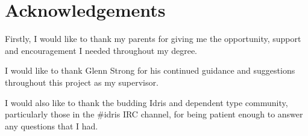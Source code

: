 \chapter*{Acknowledgements}
Firstly, I would like to thank my parents for giving me the opportunity, support
and encouragement I needed throughout my degree.

I would like to thank Glenn Strong for his continued guidance and suggestions
throughout this project as my supervisor.

I would also like to thank the budding Idris and dependent type community,
particularly those in the \#idris IRC channel, for being patient enough to
answer any questions that I had.
